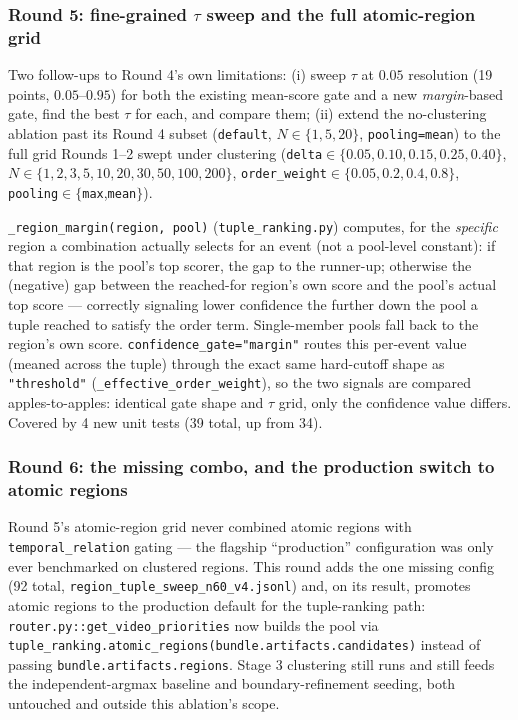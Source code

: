 \documentclass[11pt]{article}
\newcommand{\code}[1]{\texttt{\small #1}}
\newcommand{\file}[1]{\texttt{\footnotesize #1}}
\begin{document}
\subsubsection{Round 5: fine-grained $\tau$ sweep and the full atomic-region grid}
\label{sec:tuple-round5}
Two follow-ups to Round 4's own limitations: (i) sweep $\tau$ at $0.05$ resolution (19 points,
$0.05$--$0.95$) for both the existing mean-score gate and a new \emph{margin}-based gate, find the
best $\tau$ for each, and compare them; (ii) extend the no-clustering ablation past its Round 4
subset (\code{default}, $N\in\{1,5,20\}$, \code{pooling=mean}) to the full grid Rounds 1--2 swept
under clustering (\code{delta}$\in\{0.05,0.10,0.15,0.25,0.40\}$, $N\in\{1,2,3,5,10,20,30,50,100,200\}$,
\code{order\_weight}$\in\{0.05,0.2,0.4,0.8\}$, \code{pooling}$\in\{$\code{max},\code{mean}$\}$).

\code{\_region\_margin(region, pool)} (\file{tuple\_ranking.py}) computes, for the \emph{specific}
region a combination actually selects for an event (not a pool-level constant): if that region is
the pool's top scorer, the gap to the runner-up; otherwise the (negative) gap between the
reached-for region's own score and the pool's actual top score --- correctly signaling lower
confidence the further down the pool a tuple reached to satisfy the order term. Single-member pools
fall back to the region's own score. \code{confidence\_gate="margin"} routes this per-event value
(meaned across the tuple) through the exact same hard-cutoff shape as \code{"threshold"}
(\code{\_effective\_order\_weight}), so the two signals are compared apples-to-apples: identical gate
shape and $\tau$ grid, only the confidence value differs. Covered by 4 new unit tests (39 total, up
from 34).

\subsubsection{Round 6: the missing combo, and the production switch to atomic regions}
\label{sec:tuple-round6}
Round 5's atomic-region grid never combined atomic regions with \code{temporal\_relation} gating ---
the flagship ``production'' configuration was only ever benchmarked on clustered regions. This round
adds the one missing config (92 total,
\file{region\_tuple\_sweep\_n60\_v4.jsonl}) and, on its result, promotes atomic regions to the
production default for the tuple-ranking path: \code{router.py::get\_video\_priorities} now builds
the pool via \code{tuple\_ranking.atomic\_regions(bundle.artifacts.candidates)} instead of passing
\code{bundle.artifacts.regions}. Stage 3 clustering still runs and still feeds the independent-argmax
baseline and boundary-refinement seeding, both untouched and outside this ablation's scope.
\end{document}

